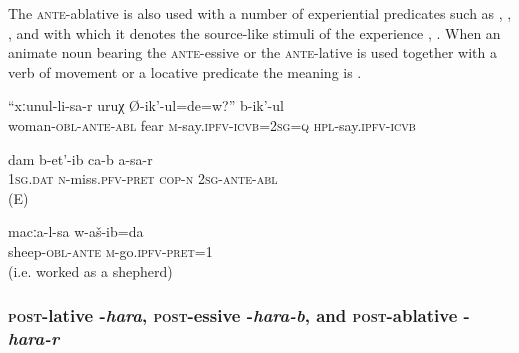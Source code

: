 The \textsc{ante}-ablative is also used with a number of experiential predicates such as , , , and  with which it denotes the source-like stimuli of the experience , . When an animate noun bearing the \textsc{ante}-essive or the \textsc{ante}-lative is used together with a verb of movement or a locative predicate the meaning is  .
%
\begin{exe}
	\ex	\label{They say, are you afraid of your wife}
	\gll	``xːunul-li-sa-r	uruχ	Ø-ik'-ul=de=w?''	b-ik'-ul \\
		woman-\textsc{obl}-\textsc{ante}-\textsc{abl} fear \textsc{m}-say.\textsc{ipfv}-\textsc{icvb}=2\textsc{sg}=\textsc{q} \textsc{hpl}-say.\textsc{ipfv}-\textsc{icvb}\\
	\glt	{}

	\ex	\label{ex:I miss youMorph}
	\gll	dam b-et'-ib ca-b a-sa-r \\
	\textsc{1sg.dat} \textsc{n}-miss.\textsc{pfv-pret} \textsc{cop-n} \textsc{2sg-ante-abl}	\\
	\glt	{} (E)
	
	\ex	\label{I went after the sheep}
	\gll	macːa-l-sa	w-aš-ib=da\\
		sheep-\textsc{obl}-\textsc{ante}	\textsc{m}-go.\textsc{ipfv}-\textsc{pret}=1\\
	\glt‎‎	 (i.e. worked as a shepherd)
\end{exe}



\subsubsection{\textsc{post}-lative -\textit{hara}, \textsc{post}-essive -\textit{hara-b}, and \textsc{post}-ablative -\textit{hara-r}}
\label{sssec:post-lative -hara, postessive -hara-b, and post-ablative -hara-r}

